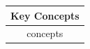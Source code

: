 

  \begin{table}
    \begin{tabular}{c}
      \hline
      \textbf{Key Concepts}  \\
      \hline
        concepts  \\
      \hline
    \end{tabular}
  \end{table}




